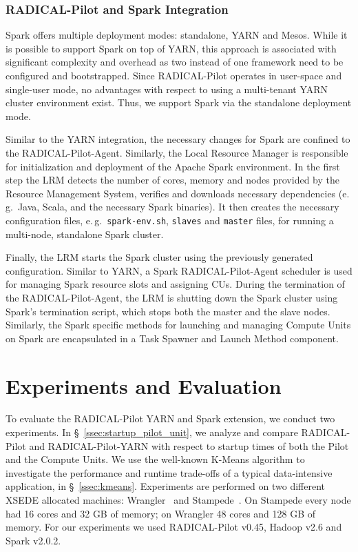 \subsubsection*{RADICAL-Pilot and Spark Integration}
\label{sssec:rp_spark}
Spark offers multiple deployment modes: standalone, YARN and Mesos.
While it is possible to support Spark on top of YARN, this approach is associated with significant complexity and overhead as two instead of one framework need to be configured and bootstrapped.
Since RADICAL-Pilot operates in user-space and single-user mode, no advantages with respect to using a multi-tenant YARN cluster environment exist.
Thus, we support Spark via the standalone deployment mode.

Similar to the YARN integration, the necessary changes for Spark are confined to the RADICAL-Pilot-Agent.
Similarly, the Local Resource Manager is responsible for initialization and deployment of the Apache Spark environment.
In the first step the LRM detects the number of cores, memory and nodes provided by the Resource Management System, verifies and downloads necessary dependencies (e.\,g.\ Java, Scala, and the necessary Spark binaries).
It then creates the necessary configuration files, e.\,g.\ \texttt{spark-env.sh}, \texttt{slaves} and \texttt{master} files, for running a multi-node, standalone Spark cluster.

Finally, the LRM starts the Spark cluster using the previously generated configuration.
Similar to YARN, a Spark RADICAL-Pilot-Agent scheduler is used for managing Spark resource slots and assigning CUs.
During the termination of the RADICAL-Pilot-Agent, the LRM is shutting down the Spark cluster using Spark’s termination script, which stops both the master and the slave nodes.
Similarly, the Spark specific methods for launching and managing Compute Units on Spark are encapsulated in a Task Spawner and Launch Method component.

\section{Experiments and Evaluation}
\label{sec:rph-exps}

To evaluate the RADICAL-Pilot YARN and Spark extension, we conduct two experiments.
In \S~\ref{ssec:startup_pilot_unit}, we analyze and compare RADICAL-Pilot and RADICAL-Pilot-YARN with respect to startup times of both the Pilot and the Compute Units.
We use the well-known K-Means algorithm to investigate the performance and runtime trade-offs of a typical data-intensive application, in \S~\ref{ssec:kmeans}.
Experiments are performed on two different XSEDE allocated machines: Wrangler~\cite{wrangler} and Stampede~\cite{stampede}.
On Stampede every node had 16 cores and 32 GB of memory; on Wrangler 48 cores and 128 GB of memory.
For our experiments we used RADICAL-Pilot v0.45, Hadoop v2.6 and Spark v2.0.2.

